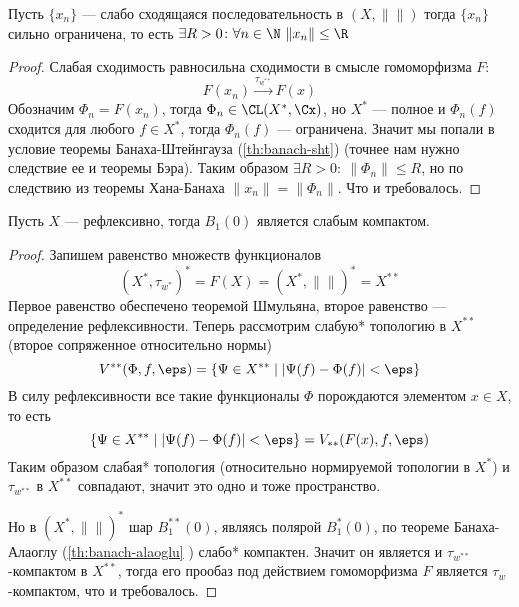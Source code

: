 \begin{claim}
	Пусть $\{x_n\}$ --- слабо сходящаяся последовательность в $(X, \|\|)$ тогда $\{x_n\}$ сильно ограничена, то есть $\exists R > 0 \colon  \forall n \in \N \ \|x_n\| \leq \R$
\end{claim}
\begin{proof}
	Слабая сходимость равносильна сходимости в смысле гомоморфизма $F$: 
	$$
	F(x_n) \xrightarrow{\tau_{w^{**}}} F(x) 
	$$
	Обозначим $\Phi_n = F(x_n)$, тогда $\Phi_n \in \CL(X^*, \Cx)$, но $X^*$ --- полное и $\Phi_n(f)$ сходится для любого $f \in X^*$, тогда $\Phi_n(f)$ --- ограничена. Значит мы попали в условие теоремы Банаха-Штейнгауза (\ref{th:banach-sht}) (точнее нам нужно следствие ее и теоремы Бэра). Таким образом $\exists R > 0: \ \|\Phi_n\| \leq R$, но по следствию из теоремы Хана-Банаха $\|x_n\| = \|\Phi_n\|$. Что и требовалось.
\end{proof}
\begin{theorem}
	Пусть $X$ --- рефлексивно, тогда $B_1(0)$ является слабым компактом.
\end{theorem}
\begin{proof}
	Запишем равенство множеств функционалов
	$$
	(X^*, \tau_{w^*})^* = F(X) = (X^*, \|\|)^* = X^{**}
	$$
	Первое равенство обеспечено теоремой Шмульяна, второе равенство --- определение рефлексивности. Теперь рассмотрим слабую* топологию в $X^{**}$ (второе сопряженное относительно нормы)
	$$
	V^{**}(\Phi, f, \eps) = \{\Psi \in X^{**} \mid |\Psi(f) - \Phi(f)| < \eps\}
	$$
	В силу рефлексивности все такие функционалы $\Phi$ порождаются элементом $x \in X$, то есть 
	$$
	\{\Psi \in X^{**} \mid |\Psi(f) - \Phi(f)| < \eps\} = V_{**}(F(x), f, \eps)
	$$
	Таким образом слабая* топология (относительно нормируемой топологии в $X^*$) и $\tau_{w^{**}}$ в $X^{**}$ совпадают, значит это одно и тоже пространство. 
	
	Но в $(X^*, \|\|)^*$ шар $B^{**}_1(0)$, являясь полярой $B^{*}_1(0)$, по теореме Банаха-Алаоглу (\ref{th:banach-alaoglu} ) слабо* компактен. Значит он является и $\tau_{w^{**}}$-компактом в $X^{**}$, тогда его прообаз под действием гомоморфизма $F$ является $\tau_w$-компактом, что и требовалось.
\end{proof}

